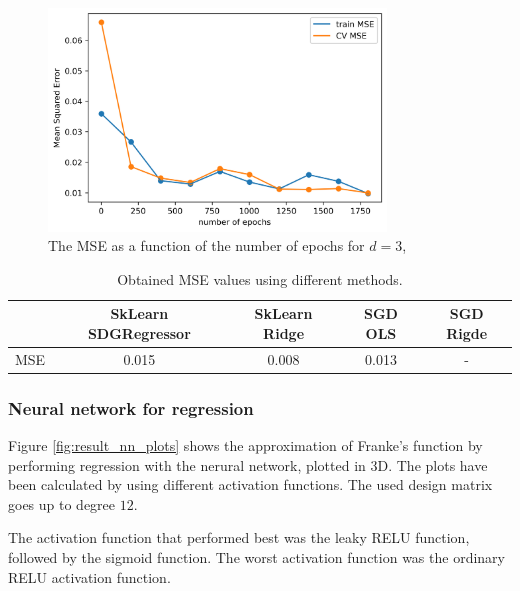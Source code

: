\documentclass[../main.tex]{subfiles}
\begin{document}
\begin{figure}[htb]
    \centering
    \includegraphics[width=0.8\textwidth]{../assets/epochs_vs_mse.png}
    \caption{The MSE as a function of the number of epochs for $d=3$, }
    \label{fig:epochs_vs_mse}
\end{figure}

\begin{table}[H]
\centering
\caption{Obtained MSE values using different methods.}
\begin{tabular}{ ccccc } 
 \toprule
  & SkLearn SDGRegressor & SkLearn Ridge & SGD OLS & SGD Rigde \\ 
 \midrule
 MSE  & 0.015 & 0.008 & 0.013 & -\\
 \bottomrule
\end{tabular}
\label{tab:MSE}
\end{table}

\subsubsection{Neural network for regression}
Figure \ref{fig:result_nn_plots} shows the approximation of Franke's function by performing regression with the nerural network, plotted in 3D. The plots have been calculated by using different activation functions. The used design matrix goes up to degree $12$.

The activation function that performed best was the leaky RELU function, followed by the sigmoid function. The worst activation function was the ordinary RELU activation function.
\end{document}
